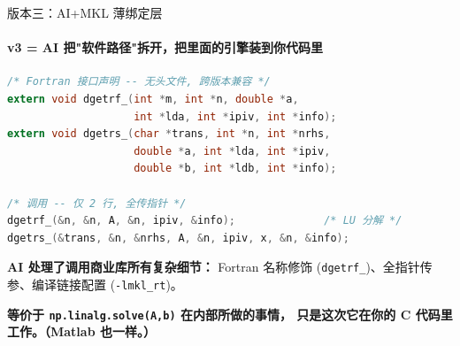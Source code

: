 \documentclass[12pt,aspectratio=169]{beamer}
\begin{document}
\begin{frame}[fragile]{版本三：AI+MKL 薄绑定层}
\framesubtitle{v3 = AI 把"软件路径"拆开，把里面的引擎装到你代码里}

\begin{lstlisting}[language=C,basicstyle=\ttfamily\footnotesize,belowskip=-2pt,numbers=none,aboveskip=0pt]
/* Fortran 接口声明 -- 无头文件, 跨版本兼容 */
extern void dgetrf_(int *m, int *n, double *a,
                    int *lda, int *ipiv, int *info);
extern void dgetrs_(char *trans, int *n, int *nrhs,
                    double *a, int *lda, int *ipiv,
                    double *b, int *ldb, int *info);

/* 调用 -- 仅 2 行, 全传指针 */
dgetrf_(&n, &n, A, &n, ipiv, &info);              /* LU 分解 */
dgetrs_(&trans, &n, &nrhs, A, &n, ipiv, x, &n, &info);
\end{lstlisting}

\vspace{4pt}
\small
\textbf{AI 处理了调用商业库所有复杂细节：} Fortran 名称修饰 (\texttt{dgetrf\_})、全指针传参、编译链接配置 (\texttt{-lmkl\_rt})。

\vspace{2pt}
\textbf{等价于 \texttt{np.linalg.solve(A,b)} 在内部所做的事情， 只是这次它在你的 C 代码里工作。（Matlab 也一样。）}
\end{frame}
\end{document}
